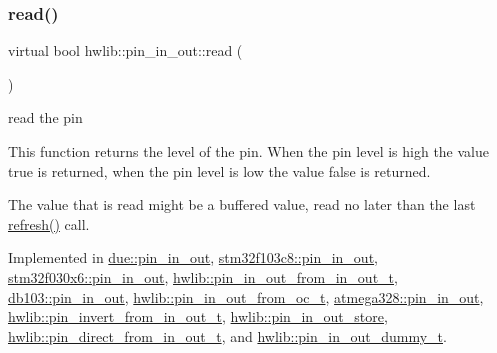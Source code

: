 \subsubsection{\texorpdfstring{read()}{read()}}
{\footnotesize\ttfamily virtual bool hwlib\+::pin\+\_\+in\+\_\+out\+::read (\begin{DoxyParamCaption}{ }\end{DoxyParamCaption})\hspace{0.3cm}{\ttfamily [pure virtual]}}

read the pin

This function returns the level of the pin. When the pin level is high the value true is returned, when the pin level is low the value false is returned.

The value that is read might be a buffered value, read no later than the last \hyperlink{classhwlib_1_1pin__in__out_a8815baac4e5193ec68795956f5e363a6}{refresh()} call. 

Implemented in \hyperlink{classdue_1_1pin__in__out_a864093a15647637d71ecd8ded27ba4f8}{due\+::pin\+\_\+in\+\_\+out}, \hyperlink{classstm32f103c8_1_1pin__in__out_a9ca1d7aba45a4f28c9a69114dd6caf5b}{stm32f103c8\+::pin\+\_\+in\+\_\+out}, \hyperlink{classstm32f030x6_1_1pin__in__out_a94c8a2495046a0240cf7bc42e870d289}{stm32f030x6\+::pin\+\_\+in\+\_\+out}, \hyperlink{classhwlib_1_1pin__in__out__from__in__out__t_ae1a321c11a2691bb6068e18835add2de}{hwlib\+::pin\+\_\+in\+\_\+out\+\_\+from\+\_\+in\+\_\+out\+\_\+t}, \hyperlink{classdb103_1_1pin__in__out_a67a48a90485305275ce4573f5e371f6a}{db103\+::pin\+\_\+in\+\_\+out}, \hyperlink{classhwlib_1_1pin__in__out__from__oc__t_ae9345a726556cf5ac138f575df044722}{hwlib\+::pin\+\_\+in\+\_\+out\+\_\+from\+\_\+oc\+\_\+t}, \hyperlink{classatmega328_1_1pin__in__out_ad30bd54f54fd54163ffb97e59ab52498}{atmega328\+::pin\+\_\+in\+\_\+out}, \hyperlink{classhwlib_1_1pin__invert__from__in__out__t_a36432019f4ab69ea26255b70641599bd}{hwlib\+::pin\+\_\+invert\+\_\+from\+\_\+in\+\_\+out\+\_\+t}, \hyperlink{classhwlib_1_1pin__in__out__store_a1adabeb1425e9068ae5bc3f1f2fddb99}{hwlib\+::pin\+\_\+in\+\_\+out\+\_\+store}, \hyperlink{classhwlib_1_1pin__direct__from__in__out__t_a6a77a6c4d2ce69cba2873bdcd087215e}{hwlib\+::pin\+\_\+direct\+\_\+from\+\_\+in\+\_\+out\+\_\+t}, and \hyperlink{classhwlib_1_1pin__in__out__dummy__t_a6cc3d99badf70aae8b076594ffd5f465}{hwlib\+::pin\+\_\+in\+\_\+out\+\_\+dummy\+\_\+t}.

\mbox{\label{classhwlib_1_1pin__in__out_a8815baac4e5193ec68795956f5e363a6}} 
